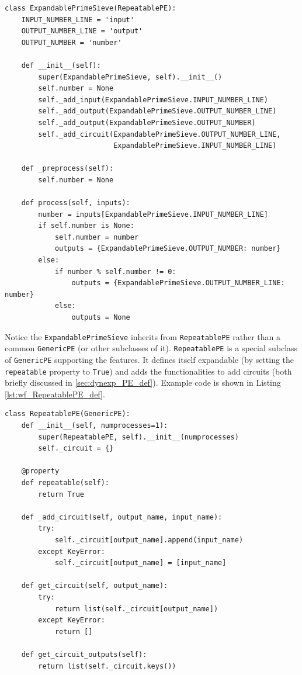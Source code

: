 \begin{lstlisting}[frame=single,caption={Example code of the ExpandablePrimeSieve class},captionpos=b,
label={lst:wf_sieve_PE_def}
]
class ExpandablePrimeSieve(RepeatablePE):
    INPUT_NUMBER_LINE = 'input'
    OUTPUT_NUMBER_LINE = 'output'
    OUTPUT_NUMBER = 'number'

    def __init__(self):
        super(ExpandablePrimeSieve, self).__init__()
        self.number = None
        self._add_input(ExpandablePrimeSieve.INPUT_NUMBER_LINE)
        self._add_output(ExpandablePrimeSieve.OUTPUT_NUMBER_LINE)
        self._add_output(ExpandablePrimeSieve.OUTPUT_NUMBER)
        self._add_circuit(ExpandablePrimeSieve.OUTPUT_NUMBER_LINE,
                          ExpandablePrimeSieve.INPUT_NUMBER_LINE)

    def _preprocess(self):
        self.number = None

    def process(self, inputs):
        number = inputs[ExpandablePrimeSieve.INPUT_NUMBER_LINE]
        if self.number is None:
            self.number = number
            outputs = {ExpandablePrimeSieve.OUTPUT_NUMBER: number}
        else:
            if number % self.number != 0:
                outputs = {ExpandablePrimeSieve.OUTPUT_NUMBER_LINE: number}
            else:
                outputs = None
\end{lstlisting}

Notice the \lstinline|ExpandablePrimeSieve| inherits from \lstinline|RepeatablePE| rather than a common \lstinline|GenericPE| (or other subclasses of it). \lstinline|RepeatablePE| is a special subclass of \lstinline|GenericPE| supporting the \tdynexp features. It defines itself expandable (by setting the \lstinline|repeatable| property to \lstinline|True|) and adds the functionalities to add circuits (both briefly discussed in \ref{sec:dynexp_PE_def}). Example code is shown in Listing \ref{lst:wf_RepeatablePE_def}.

\begin{lstlisting}[frame=single,caption={Example code of the ExpandablePrimeSieve class},captionpos=b,
label={lst:wf_RepeatablePE_def}
]
class RepeatablePE(GenericPE):
    def __init__(self, numprocesses=1):
        super(RepeatablePE, self).__init__(numprocesses)
        self._circuit = {}

    @property
    def repeatable(self):
        return True

    def _add_circuit(self, output_name, input_name):
        try:
            self._circuit[output_name].append(input_name)
        except KeyError:
            self._circuit[output_name] = [input_name]

    def get_circuit(self, output_name):
        try:
            return list(self._circuit[output_name])
        except KeyError:
            return []

    def get_circuit_outputs(self):
        return list(self._circuit.keys())
\end{lstlisting}

